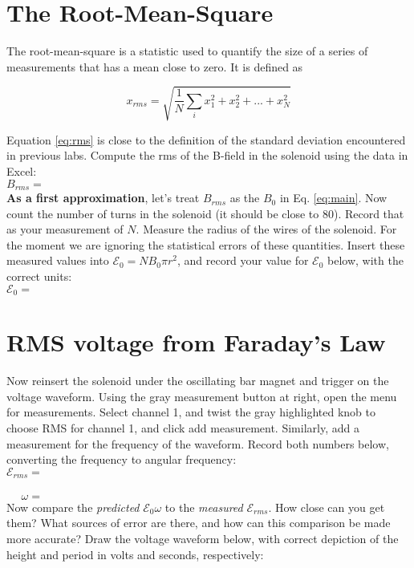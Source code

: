 \documentclass[12pt]{article}
\begin{document}
\section{The Root-Mean-Square}

The root-mean-square is a statistic used to quantify the size of a series of measurements that has a mean close to zero.  It is defined as

\begin{equation}
x_{rms} = \sqrt{\frac{1}{N}\sum_i x_1^2 + x_2^2 + ... + x_N^2} \label{eq:rms}
\end{equation}

Equation \ref{eq:rms} is close to the definition of the standard deviation encountered in previous labs.  Compute the rms of the B-field in the solenoid using the data in Excel: \\

$B_{rms} = $ \\

\textbf{As a first approximation}, let's treat $B_{rms}$ as the $B_0$ in Eq. \ref{eq:main}.  Now count the number of turns in the solenoid (it should be close to 80).  Record that as your measurement of $N$.  Measure the radius of the wires of the solenoid.  For the moment we are ignoring the statistical errors of these quantities.  Insert these measured values into $\mathcal{E}_0 = N B_0 \pi r^2$, and record your value for $\mathcal{E}_0$ below, with the correct units: \\

$\mathcal{E}_0 = $

\section{RMS voltage from Faraday's Law}

Now reinsert the solenoid under the oscillating bar magnet and trigger on the voltage waveform.  Using the gray measurement button at right, open the menu for measurements.  Select channel 1, and twist the gray highlighted knob to choose RMS for channel 1, and click add measurement.  Similarly, add a measurement for the frequency of the waveform.  Record both numbers below, converting the frequency to angular frequency: \\

$\mathcal{E}_{rms} = $ \\ \\
$~~~~~~\omega = $ \\

Now compare the \textit{predicted} $\mathcal{E}_0 \omega$ to the \textit{measured} $\mathcal{E}_{rms}$.  How close can you get them?  What sources of error are there, and how can this comparison be made more accurate?  Draw the voltage waveform below, with correct depiction of the height and period in volts and seconds, respectively: \\ \vspace{3cm}
\end{document}
